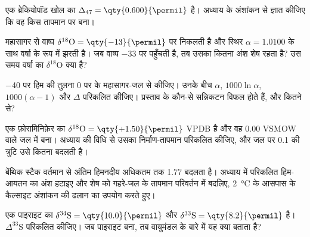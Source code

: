 \begin{exercise}[$\star$]\label{exo:b3:stable-isotopes:4}
एक ब्रेकियोपॉड खोल का $\Delta_{47} = \qty{0.600}{\permil}$ है।
अध्याय के अंशांकन से ज्ञात कीजिए कि वह किस तापमान पर बना।
\end{exercise}

\begin{exercise}[$\star\star$]\label{exo:b3:stable-isotopes:5}
महासागर से वाष्प $\delta^{18}\mathrm O = \qty{-13}{\permil}$ पर निकलती है और
स्थिर $\alpha = 1.0100$ के साथ वर्षा के रूप में झरती है। जब वाष्प
\qty{-33}{\permil} पर पहुँचती है, तब उसका कितना अंश शेष रहता है?
उस समय वर्षा का $\delta^{18}\mathrm O$ क्या है?
\end{exercise}

\begin{exercise}[$\star\star$]\label{exo:b3:stable-isotopes:6}
\qty{-40}{\permil} पर हिम की तुलना 0 पर के महासागर-जल से कीजिए। उनके बीच $\alpha$,
$1000\ln\alpha$, $1000(\alpha - 1)$ और $\Delta$ परिकलित कीजिए। प्रस्ताव के कौन-से सन्निकटन
विफल होते हैं, और कितने से?
\end{exercise}

\begin{exercise}[$\star\star$]\label{exo:b3:stable-isotopes:7}
एक फ़ोरामिनिफ़ेर का $\delta^{18}\mathrm O = \qty{+1.50}{\permil}$ VPDB है और वह
\qty{0.00}{\permil} VSMOW वाले जल में बना। अध्याय की विधि से
उसका निर्माण-तापमान परिकलित कीजिए, और जल पर \qty{0.1}{\permil} की त्रुटि
उसे कितना बदलती है।
\end{exercise}

\begin{exercise}[$\star\star$]\label{exo:b3:stable-isotopes:8}
बेंथिक स्टैक वर्तमान से अंतिम हिमनदीय अधिकतम तक \qty{1.77}{\permil} बदलता है।
अध्याय में परिकलित हिम-आयतन का अंश हटाइए और शेष को
गहरे-जल के तापमान परिवर्तन में बदलिए, \qty{2}{\celsius} के आसपास के
कैल्साइट अंशांकन की ढलान का उपयोग करते हुए।
\end{exercise}

\begin{exercise}[$\star\star$]\label{exo:b3:stable-isotopes:9}
एक पाइराइट का $\delta^{34}\mathrm S = \qty{10.0}{\permil}$ और $\delta^{33}\mathrm S =
\qty{8.2}{\permil}$ है। $\Delta^{33}\mathrm S$ परिकलित कीजिए। जब पाइराइट बना, तब
वायुमंडल के बारे में यह क्या बताता है?
\end{exercise}

